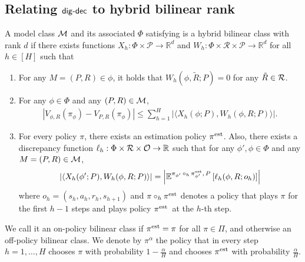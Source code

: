 

\subsection{Relating $\mathsf{dig}\text{-}\mathsf{dec}$ to hybrid bilinear rank}\label{app: hybrid bilinear }

\begin{assumption}
\label{assum:hybrid bilinear}
A model class $\mathcal{M}$ and its associated $\Phi$ satisfying  is a hybrid bilinear class with rank $d$ if there exists functions $X_h: \Phi \times \mathcal{P} \rightarrow \mathbb{R}^d$ and  $W_h: \Phi \times \mathcal{R} \times \mathcal{P} \rightarrow \mathbb{R}^d$ for all $h\in[H]$ such that 
\begin{enumerate}[leftmargin=1.5em, nosep]
 \setlength{\itemsep}{0pt} %
    \setlength{\parskip}{0pt} 
    \setlength{\topsep}{0pt}
    \item For any $M=(P,R)\in\phi$, it holds that $W_h(\phi, \tilde{R}; P)=0$ for any $\tilde{R}\in\mathcal{R}$. 
    \item For any $\phi \in \Phi$ and any $(P,R) \in \mathcal{M}$, 
    \begin{align*}
        \left|V_{\phi, R}(\pi_\phi) - V_{P,R}(\pi_\phi)\right| \leq \sum_{h=1}^H \left|\langle X_h(\phi; P), W_h(\phi, R; P)\rangle\right|.
    \end{align*}
    \item For every policy $\pi$, there exists an estimation policy $\pi^{\operatorname*{est}}$. Also, there exists a discrepancy function $\ell_h: \Phi \times \mathcal{R}\times \mathcal{O}  \rightarrow \mathbb{R}$ such that for any $\phi', \phi \in \Phi$ and any $M=(P,R)\in\mathcal{M}$,  
    \begin{align*}
        \left|\langle X_h(\phi'; P), W_h(\phi, R; P) \rangle\right| = \left|\mathbb{E}^{\pi_{\phi'} \,\circ_h\, \pi_{\phi'}^{\operatorname*{est}},\, P} \left[\ell_h(\phi, R; o_h)\right]\right| 
    \end{align*}
    where $o_h = (s_h,a_h, r_h, s_{h+1})$ and $\pi \circ_h \pi^{\operatorname*{est}}$ denotes a policy that plays $\pi$ for the first $h-1$ steps and plays policy $\pi^{\operatorname*{est}}$\, at the $h$-th step. 
\end{enumerate}
We call it an on-policy bilinear class if $\pi^{\operatorname*{est}}=\pi$ for all $\pi\in\Pi$, and otherwise an off-policy bilinear class. We denote by $\pi^\alpha$ the policy that in every step $h=1,\ldots, H$ chooses $\pi$ with probability $1-\frac{\alpha}{H}$ and chooses $\pi^{\operatorname*{est}}$ with probability $\frac{\alpha}{H}$. 
\end{assumption}

